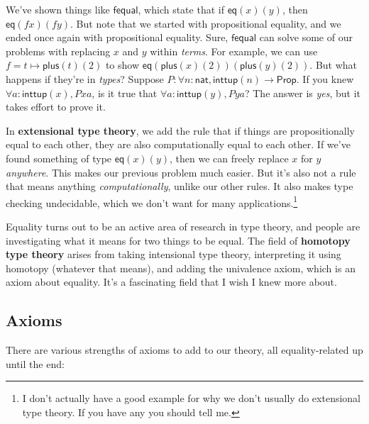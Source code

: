 \documentclass[11pt,paper=letter]{scrartcl}
\newcommand{\sf}{\mathsf}
\newcommand{\prop}{\mathsf{Prop}}
\begin{document}
We've shown things like $\sf{fequal}$, which state that if $\sf{eq}(x)(y)$, then $\sf{eq}(fx)(fy)$. But note that we started with propositional equality, and we ended once again with propositional equality. Sure, $\sf{fequal}$ can solve some of our problems with replacing $x$ and $y$ within \emph{terms}. For example, we can use $f = t \mapsto \sf{plus}(t)(2)$ to show $\sf{eq}(\sf{plus}(x)(2))(\sf{plus}(y)(2))$. But what happens if they're in \emph{types}? Suppose $P: \forall n: \sf{nat}, \sf{inttup}(n) \to \prop$. If you knew $\forall a: \sf{inttup}(x), Pxa$, is it true that $\forall a: \sf{inttup}(y), Pya$? The answer is \emph{yes}, but it takes effort to prove it.

In \textbf{extensional type theory}, we add the rule that if things are propositionally equal to each other, they are also computationally equal to each other. If we've found something of type $\sf{eq}(x)(y)$, then we can freely replace $x$ for $y$ \emph{anywhere}. This makes our previous problem much easier. But it's also not a rule that means anything \emph{computationally}, unlike our other rules. It also makes type checking undecidable, which we don't want for many applications.\footnote{I don't actually have a good example for why we don't usually do extensional type theory. If you have any you should tell me.}

Equality turns out to be an active area of research in type theory, and people are investigating what it means for two things to be equal. The field of \textbf{homotopy type theory} arises from taking intensional type theory, interpreting it using homotopy (whatever that means), and adding the univalence axiom, which is an axiom about equality. It's a fascinating field that I wish I knew more about.

\subsection{Axioms}

There are various strengths of axioms to add to our theory, all equality-related up until the end:
\end{document}
